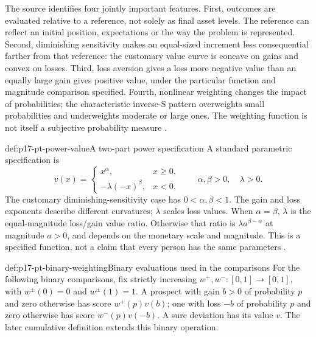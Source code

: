 The source identifies four jointly important features. First, outcomes
are evaluated relative to a reference, not solely as final asset levels.
The reference can reflect an initial position, expectations or the way
the problem is represented. Second, diminishing sensitivity makes an
equal-sized increment less consequential farther from that reference:
the customary value curve is concave on gains and convex on losses.
Third, loss aversion gives a loss more negative value than an equally
large gain gives positive value, under the particular function and
magnitude comparison specified. Fourth, nonlinear weighting changes
the impact of probabilities; the characteristic inverse-S pattern
overweights small probabilities and underweights moderate or large ones.
The weighting function is not itself a subjective probability measure
\cite[pp.~485--486]{Glockner2021ProspectTheory}.

\begin{hbdefinition}{def:p17-pt-power-value}{A two-part power specification}
A standard parametric specification is
\[
 v(x)=
 \begin{cases}
  x^\alpha,&x\geq0,\\
  -\lambda(-x)^\beta,&x<0,
 \end{cases}
 \qquad \alpha,\beta>0,\quad\lambda>0.
\]
The customary diminishing-sensitivity case has
\(0<\alpha,\beta<1\). The gain and loss exponents describe different
curvatures; \(\lambda\) scales loss values. When \(\alpha=\beta\),
\(\lambda\) is the equal-magnitude loss/gain value ratio. Otherwise
that ratio is \(\lambda a^{\beta-\alpha}\) at magnitude \(a>0\),
and depends on the monetary scale and magnitude. This is a specified
function, not a claim that every person has the same parameters
\cite[p.~488]{Glockner2021ProspectTheory}
\cite[p.~309]{TverskyKahneman1992Cumulative}.
\end{hbdefinition}

\begin{hbconvention}{def:p17-pt-binary-weighting}{Binary evaluations used in the comparisons}
For the following binary comparisons, fix strictly increasing
\(w^+,w^-:[0,1]\to[0,1]\), with \(w^\pm(0)=0\) and
\(w^\pm(1)=1\). A prospect with gain \(b>0\) of probability
\(p\) and zero otherwise has score \(w^+(p)v(b)\); one with
loss \(-b\) of probability \(p\) and zero otherwise has score
\(w^-(p)v(-b)\). A sure deviation has its value \(v\).
The later cumulative definition extends this binary operation.
\end{hbconvention}

